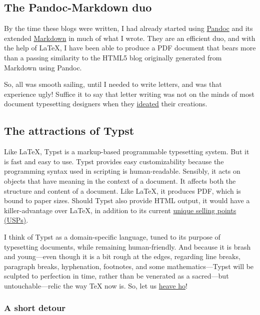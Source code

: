 \documentclass[
  a4paper,
]{article}
\begin{document}
\subsection{The Pandoc-Markdown duo}\label{the-pandoc-markdown-duo}

By the time these blogs were written, I had already started using
\href{https://pandoc.org/}{Pandoc} and its extended
\href{https://pandoc.org/chunkedhtml-demo/8-pandocs-markdown.html}{Markdown}
in much of what I wrote. They are an efficient duo, and with the help of
LaTeX, I have been able to produce a PDF document that bears more than a
passing similarity to the HTML5 blog originally generated from Markdown
using Pandoc.

So, all was smooth sailing, until I needed to write letters, and was
that experience ugly! Suffice it to say that letter writing was not on
the minds of most document typesetting designers when they
\href{https://www.thefreedictionary.com/ideated}{ideated} their
creations.

\subsection{The attractions of Typst}\label{the-attractions-of-typst}

Like LaTeX, Typst is a markup-based programmable typesetting system. But
it is fast and easy to use. Typst provides easy customizability because
the programming syntax used in scripting is human-readable. Sensibly, it
acts on objects that have meaning in the context of a document. It
affects both the structure and content of a document. Like LaTeX, it
produces PDF, which is bound to paper sizes. Should Typst also provide
HTML output, it would have a killer-advantage over LaTeX, in addition to
its current
\href{https://www.techtarget.com/whatis/definition/unique-selling-point-USP}{unique
selling points (USPs)}.

I think of Typst as a domain-specific language, tuned to its purpose of
typesetting documents, while remaining human-friendly. And because it is
brash and young---even though it is a bit rough at the edges, regarding
line breaks, paragraph breaks, hyphenation, footnotes, and some
mathematics---Typst will be sculpted to perfection in time, rather than
be venerated as a sacred---but untouchable---relic the way TeX now is.
So, let us
\href{https://www.collinsdictionary.com/us/dictionary/english/heave-ho}{heave
ho}!

\subsubsection{A short detour}\label{a-short-detour}
\end{document}
